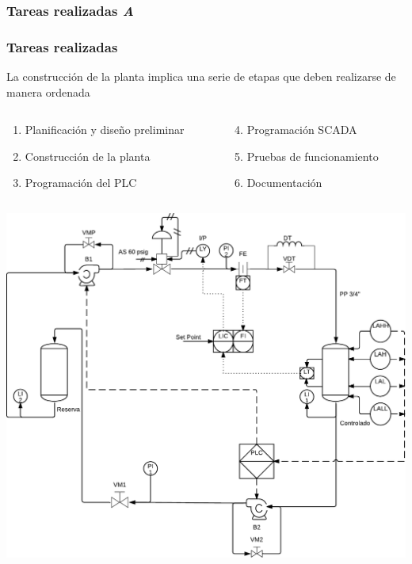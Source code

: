 \begin{frame}
	\ifdebug
	\frametitle{Tareas realizadas\hfill{\color{red} \emph{A}}}
	\else
	\frametitle{Tareas realizadas}
	\fi
	
	 \centering
	  La construcción de la planta implica una serie de etapas que deben 
realizarse de manera ordenada
	 
	 \begin{columns}[t]
	  \begin{column}{0.5\textwidth}
	   \begin{enumerate}
	    \item Planificación y diseño preliminar
	    \item Construcción de la planta
	    \item Programación del PLC
	   \end{enumerate}
	  \end{column}
	  \begin{column}{0.5\textwidth}
	  \begin{enumerate}
	    \setcounter{enumi}{3}
	    \item Programación SCADA
	    \item Pruebas de funcionamiento
	    \item Documentación
	   \end{enumerate}
	  \end{column}
	 \end{columns}
	 \vspace{.5cm}
	 \begin{columns}
	  \begin{column}{.5\textwidth}
	  \centering
	  \includegraphics[height=.7\textwidth]
{Sections/2-DisenoEnsamblado/Images/pyid60-1.pdf}

\end{column}
\end{columns}
\end{frame}
